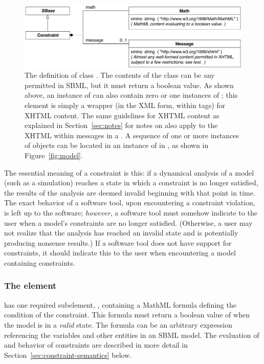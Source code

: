 \begin{figure}[htb]
  \centering
  \small
  \includegraphics[scale=0.8]{figs/constraint-uml}
  \caption{The definition of class \Constraint.  The
      contents of the  class can be any \mathml
      permitted in SBML, but it must return a boolean value.  As
      shown above, an instance of \Constraint can also contain
      zero or one instances of ; this element is
      simply a wrapper (in the XML form, within  tags) for XHTML content.  The same
      guidelines for XHTML content as explained in
      Section~\ref{sec:notes} for notes on \SBase also apply to
      the XHTML within messages in a \Constraint. A sequence of
      one or more instances of \Constraint objects can be located
      in an instance of \ListOfConstraints in \Model, as shown in
      Figure~\protect\ref{fig:model}.}
  \label{fig:constraint}
\end{figure}

The essential meaning of a constraint is this: if a dynamical
analysis of a model (such as a simulation) reaches a state in
which a constraint is no longer satisfied, the results of the
analysis are deemed invalid beginning with that point in time.
The exact behavior of a software tool, upon encountering a
constraint violation, is left up to the software; \emph{however},
a software tool must somehow indicate to the user when a model's
constraints are no longer satisfied.  (Otherwise, a user may not
realize that the analysis has reached an invalid state and is
potentially producing nonsense results.)  If a software tool does
not have support for constraints, it should indicate this to the
user when encountering a model containing constraints.


\subsubsection{The  element}

\Constraint has one required subelement, ,
containing a MathML formula defining the condition of the
constraint.  This formula must return a boolean value of
 when the model is in a \emph{valid} state.  The formula
can be an arbitrary expression referencing the variables and other
entities in an SBML model.  The evaluation of  and
behavior of constraints are described in more detail in
Section~\ref{sec:constraint-semantics} below.



